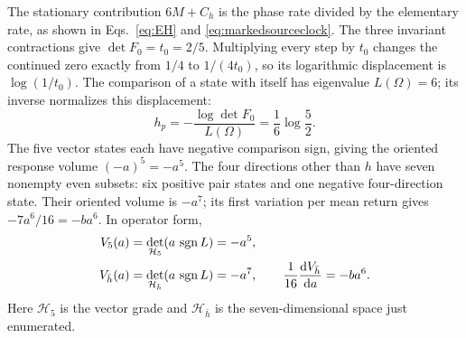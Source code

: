 \documentclass[aps,prx,onecolumn,10pt,notitlepage,nofootinbib,longbibliography]{revtex4-2}
\numberwithin{equation}{section}
\numberwithin{table}{section}
\newcommand{\sgn}{\operatorname{sgn}}
\newcommand{\dd}{\mathrm d}
\begin{document}
The stationary contribution $6M+C_h$ is the phase rate divided by the elementary rate, as shown in Eqs.~\eqref{eq:EH} and \eqref{eq:markedsourceclock}. The three invariant contractions give $\det F_0=t_0=2/5$. Multiplying every step by $t_0$ changes the continued zero exactly from $1/4$ to $1/(4t_0)$, so its logarithmic displacement is $\log(1/t_0)$. The comparison of a state with itself has eigenvalue $L(\Omega)=6$; its inverse normalizes this displacement:
\begin{equation}
 h_p=-\frac{\log\det F_0}{L(\Omega)}=\frac16\log\frac52.
 \label{eq:gramheight}
\end{equation}
The five vector states each have negative comparison sign, giving the oriented response volume $(-a)^5=-a^5$. The four directions other than $h$ have seven nonempty even subsets: six positive pair states and one negative four-direction state. Their oriented volume is $-a^7$; its first variation per mean return gives $-7a^6/16=-ba^6$. In operator form,
\begin{align}
 V_5(a)&=\det_{\mathcal H_5}(a\,\sgn L)=-a^5,\notag\\
 V_{\bar h}(a)&=\det_{\mathcal H_{\bar h}}(a\,\sgn L)=-a^7,
 \qquad \frac1{16}\frac{\dd V_{\bar h}}{\dd a}=-ba^6.
 \label{eq:protonvolumes}
\end{align}
Here $\mathcal H_5$ is the vector grade and $\mathcal H_{\bar h}$ is the seven-dimensional space just enumerated.
\end{document}
